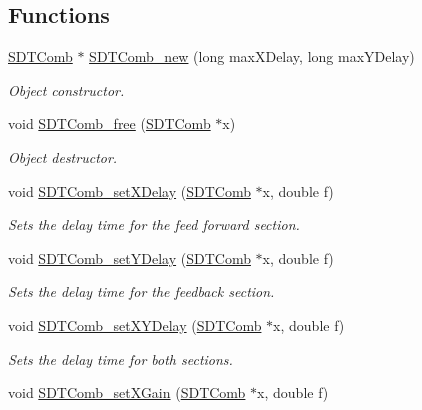 \subsection*{Functions}
\begin{DoxyCompactItemize}
\item 
\hyperlink{group__comb_ga6d48ca6dc0e03cd39bc44193e4d208db}{S\+D\+T\+Comb} $\ast$ \hyperlink{group__comb_ga92ff713863bef8b57bc434787634afd6}{S\+D\+T\+Comb\+\_\+new} (long max\+X\+Delay, long max\+Y\+Delay)
\begin{DoxyCompactList}\small\item\em Object constructor. \end{DoxyCompactList}\item 
void \hyperlink{group__comb_ga310930d194e1fd84d1ed68054aa54cef}{S\+D\+T\+Comb\+\_\+free} (\hyperlink{group__comb_ga6d48ca6dc0e03cd39bc44193e4d208db}{S\+D\+T\+Comb} $\ast$x)
\begin{DoxyCompactList}\small\item\em Object destructor. \end{DoxyCompactList}\item 
void \hyperlink{group__comb_ga986c2fc99686d4feafdd72ee10168f8e}{S\+D\+T\+Comb\+\_\+set\+X\+Delay} (\hyperlink{group__comb_ga6d48ca6dc0e03cd39bc44193e4d208db}{S\+D\+T\+Comb} $\ast$x, double f)
\begin{DoxyCompactList}\small\item\em Sets the delay time for the feed forward section. \end{DoxyCompactList}\item 
void \hyperlink{group__comb_ga3cd9614a4ebd3258be154d50d1b5d9d5}{S\+D\+T\+Comb\+\_\+set\+Y\+Delay} (\hyperlink{group__comb_ga6d48ca6dc0e03cd39bc44193e4d208db}{S\+D\+T\+Comb} $\ast$x, double f)
\begin{DoxyCompactList}\small\item\em Sets the delay time for the feedback section. \end{DoxyCompactList}\item 
void \hyperlink{group__comb_ga87f0537d8b094f217846e8925db9510f}{S\+D\+T\+Comb\+\_\+set\+X\+Y\+Delay} (\hyperlink{group__comb_ga6d48ca6dc0e03cd39bc44193e4d208db}{S\+D\+T\+Comb} $\ast$x, double f)
\begin{DoxyCompactList}\small\item\em Sets the delay time for both sections. \end{DoxyCompactList}\item 
void \hyperlink{group__comb_ga9a4fde40832f1109ebcbdd80e9dff8de}{S\+D\+T\+Comb\+\_\+set\+X\+Gain} (\hyperlink{group__comb_ga6d48ca6dc0e03cd39bc44193e4d208db}{S\+D\+T\+Comb} $\ast$x, double f)

\end{DoxyCompactItemize}
